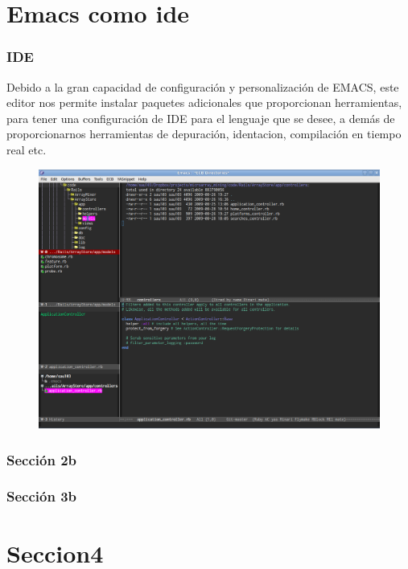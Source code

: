 \documentclass{beamer}
\begin{document}
\section{Emacs como ide}
\begin{frame}[allowframebreaks]
\frametitle{IDE}
Debido a la gran capacidad de configuraci\'on y personalizaci\'on de EMACS, este editor nos permite instalar paquetes adicionales que proporcionan herramientas, para tener una configuraci\'on de IDE para el lenguaje que se desee, a dem\'as de proporcionarnos herramientas de depuraci\'on, identacion, compilaci\'on en tiempo real etc.
\begin{figure}[h]
\centering
\includegraphics[height=0.3\textheight]{img/conf.png}
\end{figure}
\end{frame}

\begin{frame}[allowframbreaks]
\frametitle{Sección 2b}
\end{frame}

\begin{frame}[allowframbreaks]
\frametitle{Sección 3b}
\end{frame}

\section{Seccion4}
\end{document}
